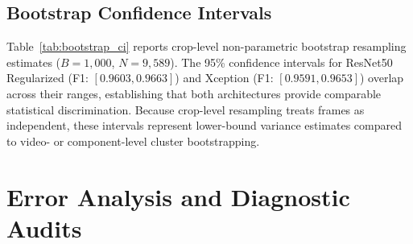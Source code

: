 \documentclass[conference]{IEEEtran}
\begin{document}
\subsection{Bootstrap Confidence Intervals}

Table~\ref{tab:bootstrap_ci} reports crop-level non-parametric bootstrap resampling estimates ($B=1{,}000$, $N=9{,}589$). The 95\% confidence intervals for ResNet50 Regularized (F1: $[0.9603, 0.9663]$) and Xception (F1: $[0.9591, 0.9653]$) overlap across their ranges, establishing that both architectures provide comparable statistical discrimination. Because crop-level resampling treats frames as independent, these intervals represent lower-bound variance estimates compared to video- or component-level cluster bootstrapping.

\begin{table}[!t]
\caption{Non-Parametric Bootstrap Confidence Intervals ($B=1{,}000$, $N=9{,}589$).}
\label{tab:bootstrap_ci}
\centering
{}
\end{table}


\section{Error Analysis and Diagnostic Audits}
\label{sec:audits}
\end{document}
